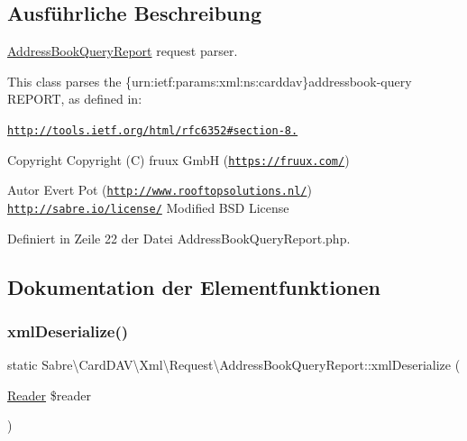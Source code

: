 \subsection{Ausführliche Beschreibung}
\mbox{\hyperlink{class_sabre_1_1_card_d_a_v_1_1_xml_1_1_request_1_1_address_book_query_report}{Address\+Book\+Query\+Report}} request parser.

This class parses the \{urn\+:ietf\+:params\+:xml\+:ns\+:carddav\}addressbook-\/query R\+E\+P\+O\+RT, as defined in\+:

\href{http://tools.ietf.org/html/rfc6352#section-8.6}{\tt http\+://tools.\+ietf.\+org/html/rfc6352\#section-\/8.}

\begin{DoxyCopyright}{Copyright}
Copyright (C) fruux GmbH (\href{https://fruux.com/}{\tt https\+://fruux.\+com/}) 
\end{DoxyCopyright}
\begin{DoxyAuthor}{Autor}
Evert Pot (\href{http://www.rooftopsolutions.nl/}{\tt http\+://www.\+rooftopsolutions.\+nl/})  \href{http://sabre.io/license/}{\tt http\+://sabre.\+io/license/} Modified B\+SD License 
\end{DoxyAuthor}


Definiert in Zeile 22 der Datei Address\+Book\+Query\+Report.\+php.



\subsection{Dokumentation der Elementfunktionen}
\mbox{\label{class_sabre_1_1_card_d_a_v_1_1_xml_1_1_request_1_1_address_book_query_report_a202e440a8044a9399b392752edfed123}} 
\subsubsection{\texorpdfstring{xml\+Deserialize()}{xmlDeserialize()}}
{\footnotesize\ttfamily static Sabre\textbackslash{}\+Card\+D\+A\+V\textbackslash{}\+Xml\textbackslash{}\+Request\textbackslash{}\+Address\+Book\+Query\+Report\+::xml\+Deserialize (\begin{DoxyParamCaption}\item[{\mbox{\hyperlink{class_sabre_1_1_xml_1_1_reader}{Reader}}}]{\$reader }\end{DoxyParamCaption})\hspace{0.3cm}{\ttfamily [static]}}

